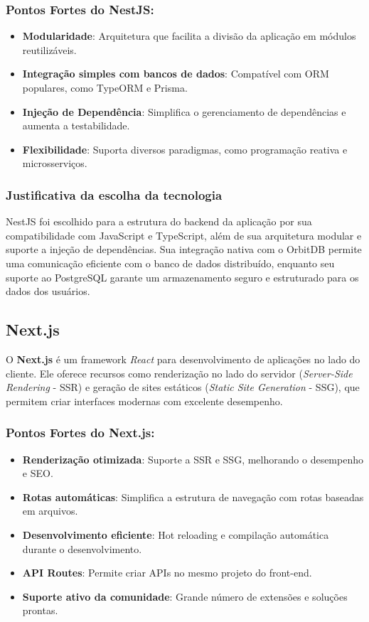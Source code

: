 \subsubsection*{Pontos Fortes do NestJS:}
\begin{itemize}
    \item \textbf{Modularidade}: Arquitetura que facilita a divisão da aplicação em módulos reutilizáveis.
    \item \textbf{Integração simples com bancos de dados}: Compatível com ORM populares, como TypeORM e Prisma.
    \item \textbf{Injeção de Dependência}: Simplifica o gerenciamento de dependências e aumenta a testabilidade.
    \item \textbf{Flexibilidade}: Suporta diversos paradigmas, como programação reativa e microsserviços.
\end{itemize}

\subsubsection{Justificativa da escolha da tecnologia}
NestJS foi escolhido para a estrutura do backend da aplicação por sua compatibilidade com JavaScript e TypeScript, além de sua arquitetura modular e suporte a injeção de dependências. Sua integração nativa com o OrbitDB permite uma comunicação eficiente com o banco de dados distribuído, enquanto seu suporte ao PostgreSQL garante um armazenamento seguro e estruturado para os dados dos usuários.

\subsection{Next.js}

O \textbf{Next.js} é um framework \textit{React} para desenvolvimento de aplicações no lado do cliente. Ele oferece recursos como renderização no lado do servidor (\textit{Server-Side Rendering} - SSR) e geração de sites estáticos (\textit{Static Site Generation} - SSG), que permitem criar interfaces modernas com excelente desempenho.

\subsubsection*{Pontos Fortes do Next.js:}
\begin{itemize}
    \item \textbf{Renderização otimizada}: Suporte a SSR e SSG, melhorando o desempenho e SEO.
    \item \textbf{Rotas automáticas}: Simplifica a estrutura de navegação com rotas baseadas em arquivos.
    \item \textbf{Desenvolvimento eficiente}: Hot reloading e compilação automática durante o desenvolvimento.
    \item \textbf{API Routes}: Permite criar APIs no mesmo projeto do front-end.
    \item \textbf{Suporte ativo da comunidade}: Grande número de extensões e soluções prontas.
\end{itemize}

